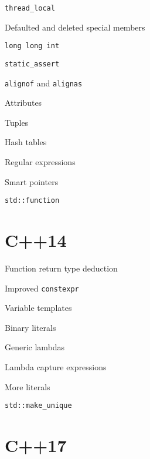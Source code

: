 \documentclass[presentation]{beamer}
\begin{document}
\begin{frame}[fragile,label={sec:orgheadline20}]{\texttt{thread\_local}}
\end{frame}
\begin{frame}[label={sec:orgheadline21}]{Defaulted and deleted special members}
\end{frame}
\begin{frame}[fragile,label={sec:orgheadline22}]{\texttt{long long int}}
\end{frame}
\begin{frame}[fragile,label={sec:orgheadline23}]{\texttt{static\_assert}}
\end{frame}
\begin{frame}[fragile,label={sec:orgheadline24}]{\texttt{alignof} and \texttt{alignas}}
\end{frame}
\begin{frame}[label={sec:orgheadline25}]{Attributes}
\end{frame}
\begin{frame}[label={sec:orgheadline26}]{Tuples}
\end{frame}
\begin{frame}[label={sec:orgheadline27}]{Hash tables}
\end{frame}
\begin{frame}[label={sec:orgheadline28}]{Regular expressions}
\end{frame}
\begin{frame}[label={sec:orgheadline29}]{Smart pointers}
\end{frame}
\begin{frame}[fragile,label={sec:orgheadline30}]{\texttt{std::function}}
\end{frame}

\section{C++14}
\label{sec:orgheadline40}
\begin{frame}[label={sec:orgheadline32}]{Function return type deduction}
\end{frame}
\begin{frame}[fragile,label={sec:orgheadline33}]{Improved \texttt{constexpr}}
\end{frame}
\begin{frame}[label={sec:orgheadline34}]{Variable templates}
\end{frame}
\begin{frame}[label={sec:orgheadline35}]{Binary literals}
\end{frame}
\begin{frame}[label={sec:orgheadline36}]{Generic lambdas}
\end{frame}
\begin{frame}[label={sec:orgheadline37}]{Lambda capture expressions}
\end{frame}
\begin{frame}[label={sec:orgheadline38}]{More literals}
\end{frame}
\begin{frame}[fragile,label={sec:orgheadline39}]{\texttt{std::make\_unique}}
\end{frame}

\section{C++17}
\label{sec:orgheadline41}
\end{document}
